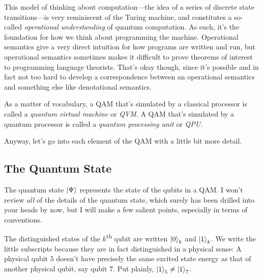 This model of thinking about computation---the idea of a series of discrete state transitions---is very reminiscent of the Turing machine, and constitutes a so-called \emph{operational understanding} of quantum computation. As such, it's the foundation for how we think about programming the machine. Operational semantics give a very direct intuition for how programs are written and run, but operational semantics sometimes makes it difficult to prove theorems of interest to programming language theorists. That's okay though, since it's possible and in fact not too hard to develop a correspondence between an operational semantics and something else like denotational semantics.

As a matter of vocabulary, a QAM that's simulated by a classical processor is called a \emph{quantum virtual machine} or \emph{QVM}. A QAM that's simulated by a quantum processor is called a \emph{quantum processing unit} or \emph{QPU}.

Anyway, let's go into each element of the QAM with a little bit more detail.

\subsection{The Quantum State}
The quantum state $\ket{\Psi}$ represents the state of the qubits in a QAM. I won't review \emph{all} of the details of the quantum state, which surely has been drilled into your heads by now, but I will make a few salient points, especially in terms of conventions.

The distinguished states of the $k$\textsuperscript{th} qubit are written $\ket{0}_k$ and $\ket{1}_k$. We write the little subscripts because they are in fact distinguished in a physical sense: A physical qubit $5$ doesn't have precisely the same excited state energy as that of another physical qubit, say qubit $7$. Put plainly, $\ket{1}_5\neq\ket{1}_7$.


